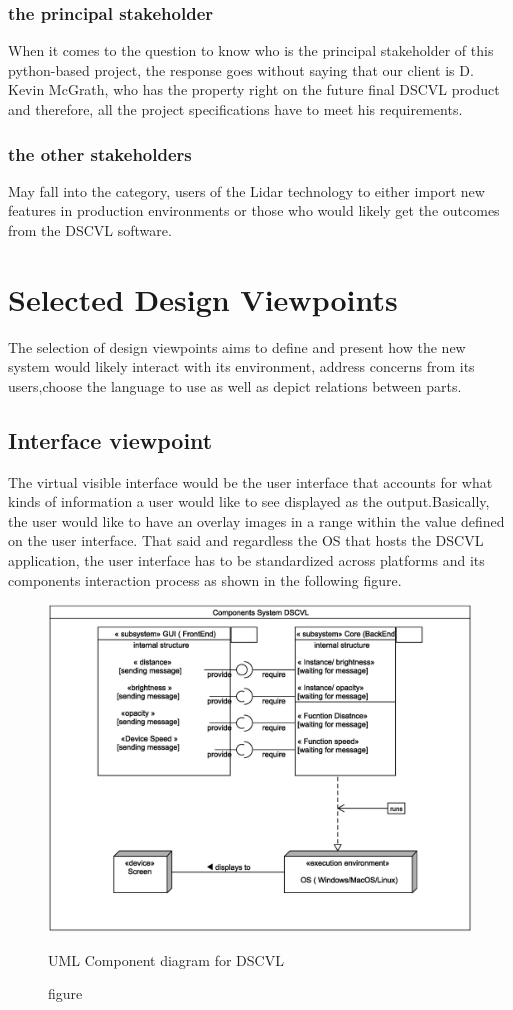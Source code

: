     	\subsubsection{the principal stakeholder}
   When it comes to the question to know who is the principal stakeholder of this python-based project, the response goes without saying that our client is D. Kevin McGrath, who has the property right on the future final DSCVL product  and therefore, all the project specifications have to meet his requirements. 
    	\subsubsection{the other stakeholders}
    	May fall into the category, users of the Lidar technology to either import new features in  production environments or those who would likely get the outcomes from the DSCVL software. 
    	
\section{Selected Design Viewpoints}
The selection of design viewpoints aims to define and present how the new system  would likely interact with its environment, address concerns from its users,choose the language to use as well as depict relations between parts.  
	\subsection{Interface viewpoint}
The virtual visible interface would be the user interface that accounts for what kinds of information a user would like to see displayed as the output.Basically, the user would like to have an overlay images in a range within the value defined on the user interface.  
That said and regardless the OS that hosts the DSCVL application, the user interface has to be standardized across platforms and its components interaction process as shown in the following figure.
\\[2ex]
    	\begin{figure}[ht]
    	 \centering \includegraphics[scale=.5]{images/components.eps}
    	\caption{figure}{ UML Component diagram for DSCVL} 
    	\end{figure}

